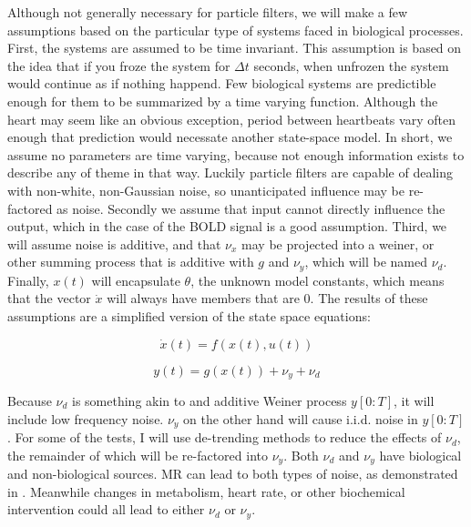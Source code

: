\documentclass{article}
\begin{document}
Although not generally necessary for particle filters, we will make a few
assumptions based on the particular type of systems faced in biological 
processes. First, the systems are assumed to be time invariant. This 
assumption is based on the idea that if you froze the system for $\Delta t$
seconds, when unfrozen the system would continue as if nothing happend. 
Few biological systems are predictible enough for them to be summarized
by a time varying function. Although the heart may seem like an obvious
exception, period between heartbeats vary often enough that prediction
would necessate another state-space model. In short, we
assume no parameters are time varying, because not enough information exists to
describe any of theme in that way. Luckily particle filters are capable 
of dealing with non-white, non-Gaussian noise, so unanticipated influence
may be re-factored as noise. Secondly we assume that input cannot directly
influence the output, which in the case of the BOLD signal is a good assumption.
Third, we will assume noise is additive, and that $\nu_x$ may be projected into
a weiner, or other summing process that is additive with $g$ and $\nu_y$, which
will be named $\nu_d$.
Finally, $x(t)$ will encapsulate $\theta$, the unknown model constants, which
means that the vector $\dot{x}$ will always have members
that are 0. The results of these assumptions are a simplified version of the
state space equations:

\begin{equation}
\label{stateass}
\dot{x}(t) = f(x(t), u(t))
\end{equation}

\begin{equation}
\label{measass}
y(t) = g(x(t)) + \nu_y + \nu_d
\end{equation}

Because $\nu_d$ is something akin to and additive Weiner process $y[0:T]$, it 
will include low frequency noise. $\nu_y$ on the other hand will cause i.i.d. noise
in $y[0:T]$. For some of the tests, I will use de-trending methods to reduce the effects of 
$\nu_d$, the remainder of which will be re-factored into $\nu_y$. Both $\nu_d$ and $\nu_y$
have biological and non-biological sources. MR can lead to both types of noise, 
as demonstrated in \cite{drift}. Meanwhile changes in metabolism, heart rate, or
other biochemical intervention could all lead to either $\nu_d$ or $\nu_y$.
\end{document}
